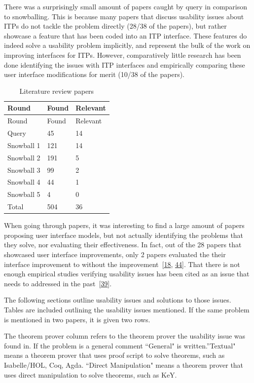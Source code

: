 \documentclass[
]{article}
\begin{document}
There was a surprisingly small amount of papers caught by query in
comparison to snowballing. This is because many papers that discuss
usability issues about ITPs do not tackle the problem directly (28/38 of
the papers), but rather showcase a feature that has been coded into an
ITP interface. These features do indeed solve a usability problem
implicitly, and represent the bulk of the work on improving interfaces
for ITPs. However, comparatively little research has been done
identifying the issues with ITP interfaces and empirically comparing
these user interface modifications for merit (10/38 of the papers).

\hypertarget{tbl:litresults}{}
\begin{longtable}[]{@{}lll@{}}
\caption{\label{tbl:litresults}Literature review papers}\tabularnewline
\toprule
Round & Found & Relevant \\
\midrule
\endfirsthead
\toprule
Round & Found & Relevant \\
\midrule
\endhead
Query & 45 & 14 \\
Snowball 1 & 121 & 14 \\
Snowball 2 & 191 & 5 \\
Snowball 3 & 99 & 2 \\
Snowball 4 & 44 & 1 \\
Snowball 5 & 4 & 0 \\
Total & 504 & 36 \\
\bottomrule
\end{longtable}

When going through papers, it was interesting to find a large amount of
papers proposing user interface models, but not actually identifying the
problems that they solve, nor evaluating their effectiveness. In fact,
out of the 28 papers that showcased user interface improvements, only 2
papers evaluated the their interface improvement to without the
improvement~{[}\protect\hyperlink{ref-berman_development_2014}{18},
\protect\hyperlink{ref-hentschel_empirical_2016}{44}{]}. That there is
not enough empirical studies verifying usability issues has been cited
as an issue that needs to addressed in the
past~{[}\protect\hyperlink{ref-hahnle_deductive_2019}{39}{]}.

The following sections outline usability issues and solutions to those
issues. Tables are included outlining the usability issues mentioned. If
the same problem is mentioned in two papers, it is given two rows.

The theorem prover column refers to the theorem prover the usability
issue was found in. If the problem is a general comment ``General" is
written.''Textual" means a theorem prover that uses proof script to
solve theorems, such as Isabelle/HOL, Coq, Agda. ``Direct Manipulation"
means a theorem prover that uses direct manipulation to solve theorems,
such as KeY.
\end{document}
